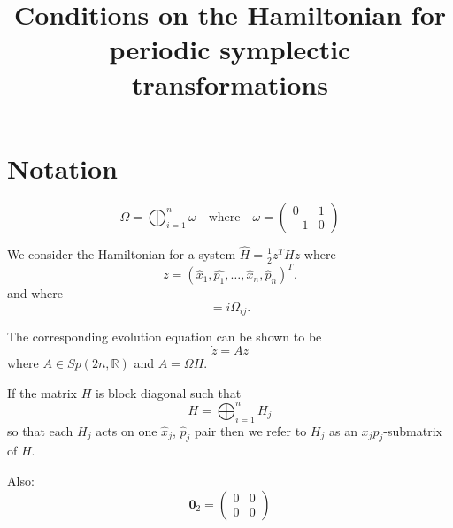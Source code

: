 
\DeclareMathOperator{\Real}{Re}


\title{Conditions on the Hamiltonian for periodic symplectic transformations}
\maketitle

\section{Notation}\label{sec:notation}
\begin{equation}
\Omega = \bigoplus_{i=1}^n \omega \quad  \text{where} \quad \omega = \begin{pmatrix} 0 & 1 \\ -1 & 0 \end{pmatrix}
\end{equation}

We consider the Hamiltonian for a system $\hat{H} = \frac{1}{2}z^T H z$ where
\begin{equation} z = (\hat{x}_1, \hat{p_1}, \ldots, \hat{x}_n, \hat{p}_n)^T. \end{equation}
and where
\begin{equation} [\hat{x}_i,\hat{p}_j] = i\Omega_{ij}. \end{equation}

The corresponding evolution equation can be shown to be
\begin{equation} \dot{z} = Az \end{equation} where $A \in Sp(2n,\mathbb{R})$ and $A = \Omega H$.

If the matrix $H$ is block diagonal such that
\begin{equation} H = \bigoplus_{i=1}^n H_j \end{equation} so that each $H_j$ acts on one $\hat{x}_j$, $\hat{p}_j$ pair then we refer to $H_j$ as an $x_jp_j$-submatrix of $H$.

Also:
\begin{equation}
\mathbf{0}_2 = \begin{pmatrix} 0 & 0 \\ 0 & 0 \end{pmatrix}
\end{equation}

